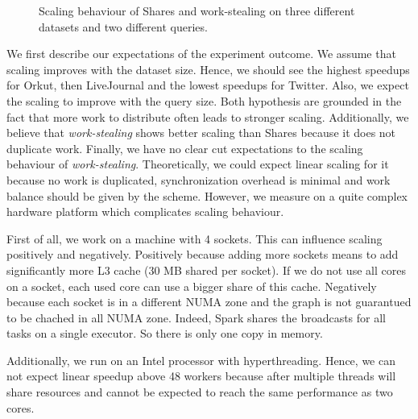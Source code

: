 \begin{figure}
    \centering
    \newline
    \caption{Scaling behaviour of Shares and work-stealing on three different datasets
      and two different queries.}
    \label{fig:graphWCOJ-scaling}
\end{figure}


We first describe our expectations of the experiment outcome.
We assume that scaling improves with the dataset size.
Hence, we should see the highest speedups for Orkut, then LiveJournal and the lowest speedups for Twitter.
Also, we expect the scaling to improve with the query size.
Both hypothesis are grounded in the fact that more work to distribute often leads to stronger scaling.
Additionally, we believe that \textit{work-stealing} shows better scaling than Shares because it does not duplicate work.
Finally, we have no clear cut expectations to the scaling behaviour of \textit{work-stealing}.
Theoretically, we could expect linear scaling for it because no work is duplicated, synchronization overhead is minimal and
work balance should be given by the scheme.
However, we measure on a quite complex hardware platform which complicates scaling behaviour.

First of all, we work on a machine with 4 sockets.
This can influence scaling positively and negatively.
Positively because adding more sockets means to add significantly more L3 cache (30 MB shared per socket).
If we do not use all cores on a socket, each used core can use a bigger share of this cache.
Negatively because each socket is in a different NUMA zone and the graph is not guarantued to be chached in all
NUMA zone.
Indeed, Spark shares the broadcasts for all tasks on a single executor.
So there is only one copy in memory. %

Additionally, we run on an Intel processor with hyperthreading.
Hence, we can not expect linear speedup above 48 workers because after multiple threads will share resources and cannot be
expected to reach the same performance as two cores.

